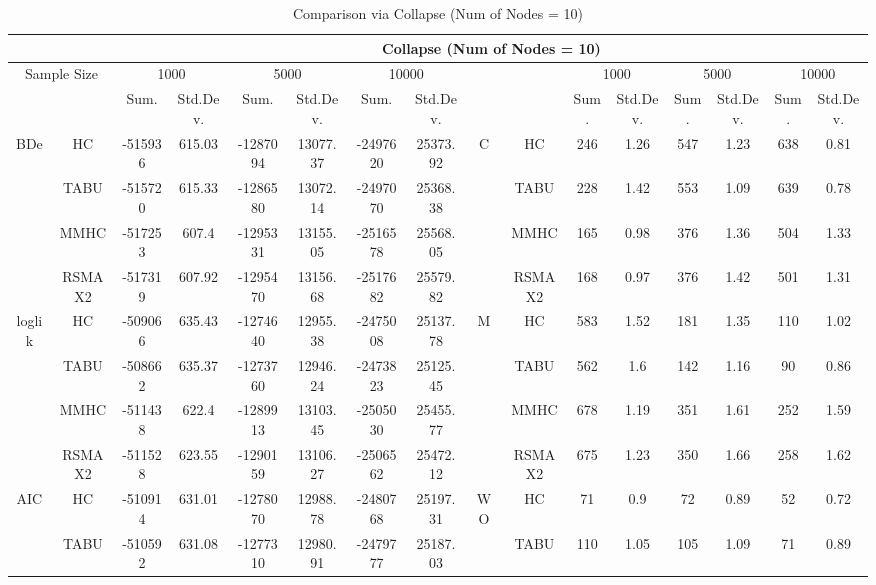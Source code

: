 \begin{table}[p]																										
\centering	\caption{Comparison  via Collapse (Num of Nodes = 10)}	\tiny																						
{\tabcolsep=0.01in																										
\begin{tabular}{cc||cc|cc|cc||cc|cc|cc|cc}																										
\hline																										
&	&	\multicolumn{14}{c}{Collapse	(Num	of	Nodes	=	10)}\tabularnewline																			
\hline																										
\multicolumn{2}{c||}{Sample	Size}	&	\multicolumn{2}{c|}{1000}	&	\multicolumn{2}{c|}{5000}	&	\multicolumn{2}{c||}{10000}	&	&	&	\multicolumn{2}{c|}{1000}	&	\multicolumn{2}{c|}{5000}	&	\multicolumn{2}{c}{10000}\tabularnewline											
\hline																										
&	&	Sum.	&	Std.Dev.	&	Sum.	&	Std.Dev.	&	Sum.	&	Std.Dev.	&	&	&	Sum.	&	Std.Dev.	&	Sum.	&	Std.Dev.	&	Sum.	&	Std.Dev.\tabularnewline
\hline																										
\hline																										
\multirow{4}{*}{BDe} & HC &	-515936 & 	615.03 & 	-1287094 & 	13077.37 & 	-2497620 & 	25373.92 & 	\multirow{4}{*}{C} & HC &	246 & 	1.26 & 	547 & 	1.23 & 	638 & 	0.81\tabularnewline													
& TABU &	-515720 & 	615.33 & 	-1286580 & 	13072.14 & 	-2497070 & 	25368.38 & 	& TABU &	228 & 	1.42 & 	553 & 	1.09 & 	639 & 	0.78\tabularnewline													
& MMHC &	-517253 & 	607.4 & 	-1295331 & 	13155.05 & 	-2516578 & 	25568.05 & 	& MMHC &	165 & 	0.98 & 	376 & 	1.36 & 	504 & 	1.33\tabularnewline													
& RSMAX2 &	-517319 & 	607.92 & 	-1295470 & 	13156.68 & 	-2517682 & 	25579.82 & 	& RSMAX2 &	168 & 	0.97 & 	376 & 	1.42 & 	501 & 	1.31\tabularnewline													
\hline																										
\multirow{4}{*}{loglik} & HC &	-509066 & 	635.43 & 	-1274640 & 	12955.38 & 	-2475008 & 	25137.78 & 	\multirow{4}{*}{M} & HC &	583 & 	1.52 & 	181 & 	1.35 & 	110 & 	1.02\tabularnewline													
& TABU &	-508662 & 	635.37 & 	-1273760 & 	12946.24 & 	-2473823 & 	25125.45 & 	& TABU &	562 & 	1.6 & 	142 & 	1.16 & 	90 & 	0.86\tabularnewline													
& MMHC &	-511438 & 	622.4 & 	-1289913 & 	13103.45 & 	-2505030 & 	25455.77 & 	& MMHC &	678 & 	1.19 & 	351 & 	1.61 & 	252 & 	1.59\tabularnewline													
& RSMAX2 &	-511528 & 	623.55 & 	-1290159 & 	13106.27 & 	-2506562 & 	25472.12 & 	& RSMAX2 &	675 & 	1.23 & 	350 & 	1.66 & 	258 & 	1.62\tabularnewline													
\hline																										
\multirow{4}{*}{AIC} & HC &	-510914 & 	631.01 & 	-1278070 & 	12988.78 & 	-2480768 & 	25197.31 & 	\multirow{4}{*}{WO} & HC &	71 & 	0.9 & 	72 & 	0.89 & 	52 & 	0.72\tabularnewline													
& TABU &	-510592 & 	631.08 & 	-1277310 & 	12980.91 & 	-2479777 & 	25187.03 & 	& TABU &	110 & 	1.05 & 	105 & 	1.09 & 	71 & 	0.89\tabularnewline													

\end{tabular}}
\end{table}
